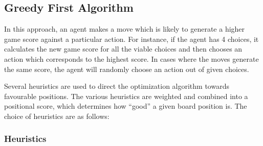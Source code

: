 \documentclass{svproc}
\begin{document}

    \subsection{Greedy First Algorithm}
    In this approach, an agent makes a move which is likely to generate a higher game score against a particular action. For instance, if the agent has 4 choices, it calculates the new game score for all the viable choices and then chooses an action which corresponds to the highest score. In cases where the moves generate the same score, the agent will randomly choose an action out of given choices.
    
    
    
    Several heuristics are used to direct the optimization algorithm towards favourable positions. The various heuristics are weighted and combined into a positional score, which determines how ``good'' a given board position is. The choice of heuristics are as follows:
    
    \subsubsection{Heuristics} \label{heuristics}
\end{document}
